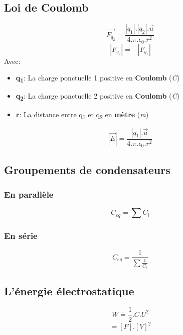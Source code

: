  \subsection{Loi de Coulomb}
 \begin{equation}
	 \overrightarrow{F_{q_{2}}} = \frac{|q_{1}|.|q_{2}|.\overrightarrow{u}}{4.\pi.\epsilon_{0}.r^2}
 \end{equation}
 \begin{equation}
	 |F_{q_{2}}| = -|F_{q_{1}}|
 \end{equation}
 Avec:
 \begin{itemize}
	 \item \textbf{q\textsubscript{1}}: La charge ponctuelle 1 positive en \textbf{Coulomb} (\textit{C})
	 \item \textbf{q\textsubscript{2}}: La charge ponctuelle 2 positive en \textbf{Coulomb} (\textit{C})
	 \item \textbf{r}: La distance entre  q\textsubscript{1} et q\textsubscript{2} en \textbf{mètre} (\textit{m})
 \end{itemize}

 \begin{equation}
	 |\overrightarrow{E}| = \frac{|q_{1}|.\overrightarrow{u}}{{4.\pi.\epsilon_{0}.r^2}}
 \end{equation}

 \subsection{Groupements de condensateurs}
 \subsubsection{En parallèle}

 \begin{equation}
	 C_{eq} = \sum C_{i}
 \end{equation}
 \subsubsection{En série}

 \begin{equation}
	 C_{eq} = \frac{1}{\sum \frac{1}{C_{i}}}
 \end{equation}


 \subsection{L'énergie électrostatique}
 \begin{equation}
	 W = \frac{1}{2}.C.U^2
 \end{equation}
 \begin{equation}
	 [J] = [F].{[V]}^2
 \end{equation}
